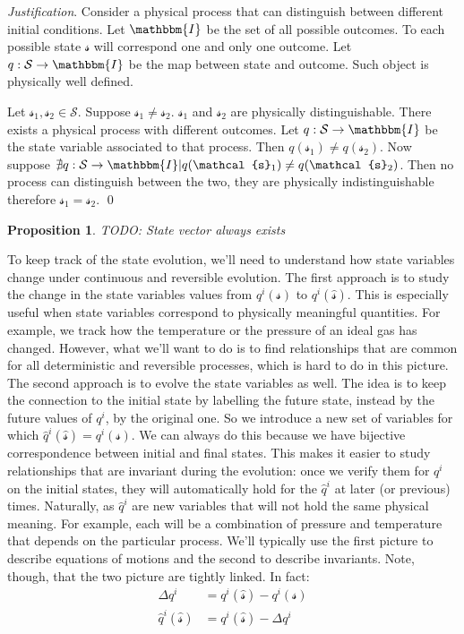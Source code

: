 \documentclass[aps,pra,10pt,twocolumn,floatfix,nofootinbib]{revtex4-1}
\newtheorem{prop}{Proposition}[section]
\theoremstyle{definition}
\newenvironment{justification}{\emph{Justification}.}{\qed}
\begin{document}
\begin{justification}
Consider a physical process that can distinguish between different initial conditions. Let $\mathbbm{I}$ be the set of all possible outcomes. To each possible state $\mathcal{s}$ will correspond one and only one outcome. Let $q : \mathcal{S} \rightarrow \mathbbm{I}$ be the map between state and outcome. Such object is physically well defined.

Let $\mathcal{s}_1, \mathcal{s}_2 \in \mathcal{S}$. Suppose $\mathcal{s}_1 \neq \mathcal{s}_2$. $\mathcal{s}_1$ and $\mathcal{s}_2$ are physically distinguishable. There exists a physical process with different outcomes. Let $q : \mathcal{S} \rightarrow \mathbbm{I}$ be the state variable associated to that process. Then $q(\mathcal{s}_1)\neq q(\mathcal{s}_2)$. Now suppose $\nexists q : \mathcal{S} \rightarrow \mathbbm{I} | q(\mathcal{s}_1) \neq q(\mathcal{s}_2)$. Then no process can distinguish between the two, they are physically indistinguishable therefore $\mathcal{s}_1 = \mathcal{s}_2$.
\end{justification}

\begin{prop}\label{state_vector}
TODO: State vector always exists
\end{prop}

To keep track of the state evolution, we'll need to understand how state variables change under continuous and reversible evolution. The first approach is to study the change in the state variables values from $q^i(\mathcal{s})$ to $q^i(\hat{\mathcal{s}})$. This is especially useful when state variables correspond to physically meaningful quantities. For example, we track how the temperature or the pressure of an ideal gas has changed. However, what we'll want to do is to find relationships that are common for all deterministic and reversible processes, which is hard to do in this picture. The second approach is to evolve the state variables as well. The idea is to keep the connection to the initial state by labelling the future state, instead by the future values of $q^i$, by the original one. So we introduce a new set of variables for which $\hat{q}^i(\hat{\mathcal{s}})=q^i(\mathcal{s})$. We can always do this because we have bijective correspondence between initial and final states. This makes it easier to study relationships that are invariant during the evolution: once we verify them for $q^i$ on the initial states, they will automatically hold for the $\hat{q}^i$ at later (or previous) times. Naturally, as $\hat{q}^i$ are new variables that will not hold the same physical meaning. For example, each will be a combination of pressure and temperature that depends on the particular process. We'll typically use the first picture to describe equations of motions and the second to describe invariants. Note, though, that the two picture are tightly linked. In fact:
\begin{align*}
\Delta q^i &= q^i(\hat{\mathcal{s}}) - q^i(\mathcal{s}) \\
\hat{q}^i(\hat{\mathcal{s}}) &= q^i(\hat{\mathcal{s}}) - \Delta q^i
\end{align*}
\end{document}
